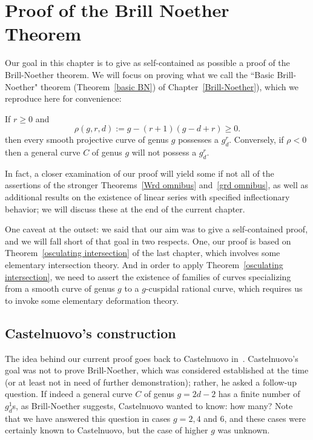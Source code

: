 

\chapter{Proof of the Brill Noether Theorem}\label{Brill Noether proof chapter}
\label{BrillNoetherproofChapter}

Our goal in this chapter is to give as self-contained as possible a proof of the Brill-Noether theorem. We will focus on proving what we call the ``Basic Brill-Noether" theorem (Theorem~\ref{basic BN}) of Chapter~\ref{Brill-Noether}), which we reproduce here for convenience:

\begin{theorem}
If $r\geq 0$ and
 $$
 \rho(g,r,d) := g - (r+1)(g-d+r) \geq 0.
$$
then every smooth projective curve of genus $g$  possesses a $g^r_d$. Conversely, if $\rho < 0$ then a general curve $C$ of genus $g$ will not possess a $g^r_d$.
\end{theorem}

In fact, a closer examination of our proof will yield some if not all of the assertions of the stronger Theorems~\ref{Wrd omnibus} and~\ref{grd omnibus}, as well as additional results on the existence of linear series with specified inflectionary behavior; we will discuss these at the end of the current chapter.

One caveat at the outset: we said that our aim was to give a self-contained proof, and we will fall short of that goal in two respects. One, our proof is based on Theorem~\ref{osculating intersection} of the last chapter, which involves some elementary intersection theory. And in order to apply Theorem~\ref{osculating intersection}, we need to assert the existence of families of curves specializing from a smooth curve of genus $g$ to a $g$-cuspidal rational curve, which requires us to invoke some elementary deformation theory. 

\section{Castelnuovo's construction}

The idea behind our current proof goes back to Castelnuovo in~\cite{}. Castelnuovo's goal was not to prove Brill-Noether, which was considered established at the time (or at least not in need of further demonstration); rather, he asked a follow-up question. If indeed a general curve $C$ of genus $g = 2d-2$ has a finite number of $g^1_d$s, as Brill-Noether suggests, Castelnuovo wanted to know: how many? Note that we have answered this question in cases $g = 2, 4$ and 6, and these cases were certainly known to Castelnuovo, but the case of higher $g$ was unknown.

